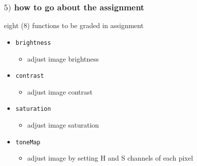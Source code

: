 \documentclass[english,14pt]{beamer}
\begin{document}

\begin{frame}[fragile]

\frametitle{$5)$ how to go about the assignment}

eight (8) functions to be graded in assignment

\begin{itemize}
	\item \texttt{brightness}
	\begin{itemize}
		\item adjust image brightness
	\end{itemize}
		
	\item \texttt{contrast}
	\begin{itemize}
		\item adjust image contrast
	\end{itemize}
			
	\item \texttt{saturation}
	\begin{itemize}
		\item adjust image saturation
	\end{itemize}
			
	\item \texttt{toneMap}
	\begin{itemize}
		\item adjust image by setting H and S channels of each pixel
	\end{itemize}
\end{itemize}

\end{frame}

\end{document}
